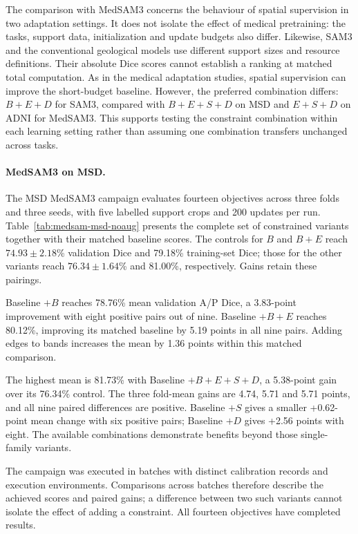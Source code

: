 \documentclass[12pt,a4paper]{article}
\begin{document}
The comparison with MedSAM3 concerns the behaviour of spatial supervision
in two adaptation settings. It does not isolate the effect of medical
pretraining: the tasks, support data, initialization and update budgets
also differ. Likewise, SAM3 and the conventional geological models use
different support sizes and resource definitions. Their absolute Dice
scores cannot establish a ranking at matched total computation.
As in the medical adaptation studies, spatial supervision can improve
the short-budget baseline. However, the preferred combination differs:
$B+E+D$ for SAM3, compared with $B+E+S+D$ on MSD and $E+S+D$
on ADNI for MedSAM3. This supports testing the constraint combination
within each learning setting rather than assuming one combination
transfers unchanged across tasks.


\FloatBarrier
\paragraph{MedSAM3 on MSD.}
\label{sec:medsam-results}

The MSD MedSAM3 campaign evaluates fourteen objectives across three
folds and three seeds, with five labelled support crops and 200 updates
per run. Table~\ref{tab:medsam-msd-noaug} presents the complete set of
constrained variants together with their matched baseline scores.
The controls for $B$ and $B+E$ reach $74.93\pm2.18$\% validation Dice
and 79.18\% training-set Dice; those for the other variants reach
$76.34\pm1.64$\% and 81.00\%, respectively. Gains retain these pairings.


Baseline $+B$ reaches 78.76\% mean validation A/P Dice, a 3.83-point improvement
with eight positive pairs out of nine. Baseline $+B+E$ reaches 80.12\%,
improving its matched baseline by 5.19 points in all nine pairs.
Adding edges to bands increases the mean by 1.36 points within this
matched comparison.

The highest mean is 81.73\% with Baseline $+B+E+S+D$, a 5.38-point
gain over its 76.34\% control. The three fold-mean gains are 4.74,
5.71 and 5.71 points, and all nine paired differences are positive.
Baseline $+S$ gives a smaller +0.62-point mean change with six positive
pairs; Baseline $+D$ gives +2.56 points with eight. The available
combinations demonstrate benefits beyond those single-family variants.

The campaign was executed in batches with distinct calibration records
and execution environments. Comparisons across batches therefore
describe the achieved scores and paired gains; a difference between two
such variants cannot isolate the effect of adding a constraint.
All fourteen objectives have completed results.
\end{document}
